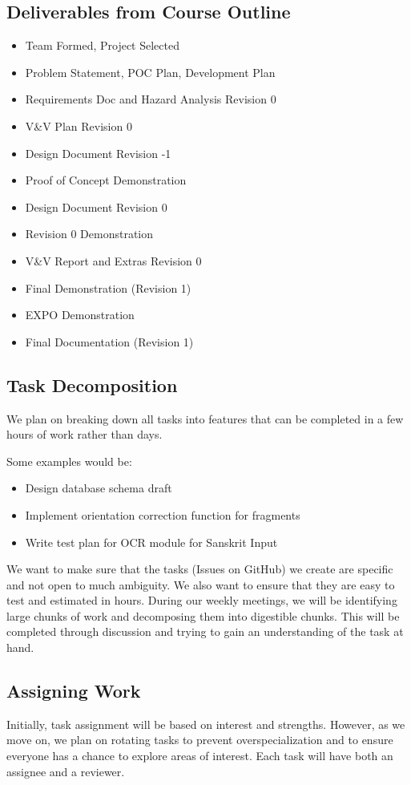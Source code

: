 \documentclass{article}
\begin{document}
\subsection*{Deliverables from Course Outline}
\begin{itemize}
    \item Team Formed, Project Selected
    \item Problem Statement, POC Plan, Development Plan
    \item Requirements Doc and Hazard Analysis Revision 0
    \item V\&V Plan Revision 0
    \item Design Document Revision -1
    \item Proof of Concept Demonstration
    \item Design Document Revision 0
    \item Revision 0 Demonstration
    \item V\&V Report and Extras Revision 0
    \item Final Demonstration (Revision 1)
    \item EXPO Demonstration
    \item Final Documentation (Revision 1)
\end{itemize}

\subsection*{Task Decomposition}
We plan on breaking down all tasks into features that can be completed in a few hours of work rather than days.

Some examples would be:
\begin{itemize}
    \item Design database schema draft
    \item Implement orientation correction function for fragments
    \item Write test plan for OCR module for Sanskrit Input
\end{itemize}

\noindent
We want to make sure that the tasks (Issues on GitHub) we create are specific and not open to much ambiguity. We also want to ensure that they are easy to test and estimated in hours. During our weekly meetings, we will be identifying large chunks of work and decomposing them into digestible chunks. This will be completed through discussion and trying to gain an understanding of the task at hand.

\subsection*{Assigning Work}
Initially, task assignment will be based on interest and strengths. However, as we move on, we plan on rotating tasks to prevent overspecialization and to ensure everyone has a chance to explore areas of interest. Each task will have both an assignee and a reviewer.
\end{document}

